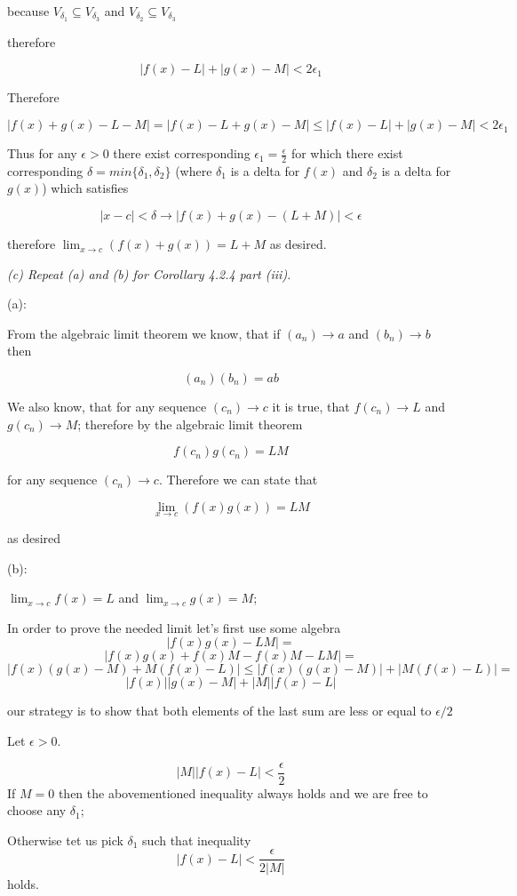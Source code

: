 \documentclass[11pt,oneside,titlepage]{book}
\begin{document}
because $V_{\delta_1} \subseteq V_{\delta_3} $ and $V_{\delta_2} \subseteq V_{\delta_3} $

therefore

$$|f(x) - L| + |g(x) - M| < 2 \epsilon_1$$

Therefore 

$$ |f(x) + g(x) - L -  M| = |f(x) - L + g(x) - M| \leq |f(x) - L| + |g(x) - M| < 2 \epsilon_1 $$

Thus for any $\epsilon > 0$ there exist corresponding $\epsilon_1 = \frac{\epsilon}{2}$ for which there
exist corresponding $\delta = min\{\delta_1, \delta_2\}$ (where $\delta_1$ is a delta for $f(x)$ and
$\delta_2$ is a delta for $g(x)$) which satisfies

$$|x - c| < \delta \to |f(x) + g(x) - (L + M)| < \epsilon$$

therefore $\lim_{x \to c}(f(x) + g(x)) = L + M$ as desired.

\textit{(c) Repeat (a) and (b) for Corollary 4.2.4 part (iii).}

(a):

From the algebraic limit theorem we know, that if $(a_n) \to a$ and $(b_n) \to b$ then

$$(a_n) (b_n) = a  b$$

We also know, that for any sequence $(c_n) \to c$ it is true, that $f(c_n) \to L$ and $g(c_n) \to M$;
therefore by the algebraic limit theorem

$$f(c_n)  g(c_n) = L M$$

for any sequence $(c_n) \to c$. Therefore we can state that

$$\lim_{x \to c}(f(x)g(x)) = L M $$

as desired

(b):

$\lim_{x \to c} f(x) = L$ and $\lim_{x \to c} g(x) = M$;

In  order to prove the needed limit let's first use some algebra
$$ |f(x)g(x) - LM| = $$
$$ |f(x)g(x) + f(x)M - f(x)M - LM| = $$
$$|f(x)(g(x) - M) + M(f(x) - L)| \leq
|f(x)(g(x) - M)| + | M(f(x) - L)| = $$
$$|f(x)||g(x) - M| + |M||f(x) - L|  $$

our strategy is to show that both elements of the last sum are less or equal to $\epsilon/2$

Let $\epsilon > 0$.

$$ |M||f(x) - L| < \frac{\epsilon}{2}$$
If $M = 0$ then the abovementioned inequality always holds and we are free to choose any $\delta_1$;

Otherwise tet us pick $\delta_1$ such that inequality
$$ |f(x) - L| < \frac{\epsilon}{2|M|}$$
holds.
\end{document}
